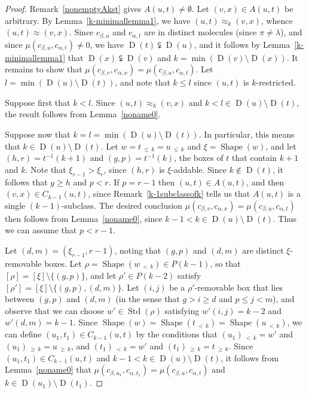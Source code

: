 \documentclass[ALCO,ThmDefs,Unicode,epreuves]{cedram}
\newcommand{\lessthan}[2]{#1\,{_{<\,#2}}}
\newcommand{\Lessthan}[2]{#1\,{_{\leqslant\,#2}}}
\newcommand{\Morethan}[2]{#1\,{_{\geqslant\,#2}}}
\DeclareMathOperator{\STD}{Std}
\DeclareMathOperator{\shape}{Shape}
\DeclareMathOperator{\D}{D}
\begin{document}
\begin{proof}
Remark~\ref{nonemptyAkst} gives $A(u,t)\neq\emptyset$. Let
$(v,x)\in A(u,t)$ be arbitrary. By Lemma~\ref{k-minimallemma1}, we have
$(u,t)\approx_k (v,x)$, whence $(u,t)\approx (v,x)$. Since $c_{\beta,u}$
and $c_{\alpha,t}$ are in distinct molecules (since $\pi\neq\lambda$),
and since $\mu(c_{\beta,u},c_{\alpha,t}) \neq 0$, we have $\D(t)\subsetneqq\D(u)$,
and it follows by Lemma~\ref{k-minimallemma1}
that $\D(x)\subsetneqq\D(v)$ and $k=\min(\D(v)\setminus\D(x))$.
It remains to show that
$\mu(c_{\beta,v},c_{\alpha,x})=\mu(c_{\beta,u},c_{\alpha,t})$.
Let $l=\min(\D(u)\setminus\D(t))$, and note that $k\leqslant l$
since $(u,t)$ is $k$-restricted.

Suppose first that $k<l$. Since $(u,t)\approx_k (v,x)$ and
$k<l\in\D(u)\setminus\D(t)$, the result follows from Lemma~\ref{noname0}.

Suppose now that $k=l=\min(\D(u)\setminus\D(t))$. In particular,
this means that $k\in\D(u)\setminus\D(t)$. Let $w=\Lessthan tk=\Lessthan uk$
and $\xi=\shape(w)$, and let $(h,r)=t^{-1}(k+1)$ and $(g,p)=t^{-1}(k)$,
the boxes of $t$ that contain $k+1$ and $k$. Note that $\xi_{r-1}>\xi_r$,
since $(h,r)$ is $\xi$-addable. Since $k\notin\D(t)$, it follows that
$g\geqslant h$ and $p<r$. If $p=r-1$ then $(u,t)\in A(u,t)$, and then
$(v,x)\in C_{k-1}(u,t)$, since Remark~\ref{k-1subclassofk} tells us that $A(u,t)$
is a single $(k-1)$-subclass. The desired conclusion
$\mu(c_{\beta,v},c_{\alpha,x})=\mu(c_{\beta,u},c_{\alpha,t})$
then follows from Lemma~\ref{noname0}, since $k-1<k\in\D(u)\setminus\D(t)$.
Thus we can assume that $p<r-1$.

Let $(d,m)=(\xi_{r-1},r-1)$, noting that $(g,p)$ and $(d,m)$ are distinct
$\xi$-removable boxes. Let $\rho=\shape(\lessthan wk)\in P(k-1)$, so that
$[\rho]=[\xi]\setminus \{(g,p)\}$, and let $\rho'\in P(k-2)$ satisfy
$[\rho']=[\xi]\setminus \{(g,p),(d,m)\}$. Let $(i,j)$ be a
$\rho'$-removable box that lies between $(g,p)$ and $(d,m)$
(in the sense that $g>i\geqslant d$ and $p\leqslant j<m$), and observe
that we can choose $w'\in\STD(\rho)$ satisfying $w'(i,j)=k-2$ and $w'(d,m)=k-1$.
Since $\shape(w)=\shape(\lessthan tk)=\shape(\lessthan uk)$, we can
define $(u_1,t_1)\in C_{k-1}(u,t)$ by the conditions that
$\lessthan {(u_1)}k = w'$ and $\Morethan {(u_1)}k = \Morethan {u}k$,
and $\lessthan {(t_1)}k = w'$ and $\Morethan {(t_1)}k = \Morethan tk$.
Since $(u_1,t_1)\in C_{k-1}(u,t)$ and $k-1<k\in\D(u)\setminus\D(t)$, it follows
from Lemma~\ref{noname0} that
$\mu(c_{\beta,u_1},c_{\alpha,t_1})=\mu(c_{\beta,u},c_{\alpha,t})$ and
$k\in\D(u_1)\setminus\D(t_1)$.


\end{proof}
\end{document}
